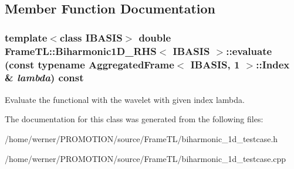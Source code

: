 \subsection{Member Function Documentation}
\hypertarget{classFrameTL_1_1Biharmonic1D__RHS_81cf28300f5a4991eea662f403b5ae88}{
\subsubsection[evaluate]{\setlength{\rightskip}{0pt plus 5cm}template$<$class IBASIS$>$ double {\bf FrameTL::Biharmonic1D\_\-RHS}$<$ IBASIS $>$::evaluate (const typename {\bf AggregatedFrame}$<$ IBASIS, 1 $>$::Index \& {\em lambda}) const}}
\label{classFrameTL_1_1Biharmonic1D__RHS_81cf28300f5a4991eea662f403b5ae88}


Evaluate the functional with the wavelet with given index lambda. 

The documentation for this class was generated from the following files:\begin{CompactItemize}
\item 
/home/werner/PROMOTION/source/FrameTL/biharmonic\_\-1d\_\-testcase.h\item 
/home/werner/PROMOTION/source/FrameTL/biharmonic\_\-1d\_\-testcase.cpp\end{CompactItemize}
